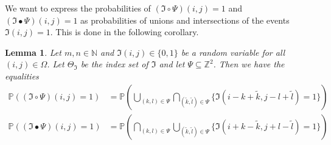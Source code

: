 \documentclass[a4paper,12pt]{article}
\theoremstyle{plain}
\newtheorem{lemma}[theorem]{Lemma}
\theoremstyle{definition}
\begin{document}
We want to express the probabilities of $(\mathfrak{I} \circ \Psi)(i, j) = 1$ and $(\mathfrak{I} \bullet \Psi)(i, j) = 1$ as probabilities of unions and intersections of the events $\mathfrak{I}(i, j) = 1$. This is done in the following corollary.

\begin{lemma}
	Let $m, n \in \mathbb{N}$ and $\mathfrak{I}(i, j) \in \{ 0, 1 \}$ be a random variable for all $(i, j) \in \Omega$. Let $\Theta_\mathfrak{I}$ be the index set of $\mathfrak{I}$ and let $\Psi \subseteq \mathbb{Z}^2$. Then we have the equalities
	\begin{align}
		\mathbb{P}\left( (\mathfrak{I} \circ \Psi)(i, j) = 1 \right) &= \mathbb{P}\left( \bigcup_{(k, l) \in \Psi} \bigcap_{(\tilde{k}, \tilde{l}) \in \Psi} \{ \mathfrak{I}(i - k + \tilde{k}, j - l + \tilde{l}) = 1 \} \label{eqeventopening} \right) \\
		\mathbb{P}\left( (\mathfrak{I} \bullet \Psi)(i, j) = 1 \right) &= \mathbb{P}\left( \bigcap_{(k, l) \in \Psi} \bigcup_{(\tilde{k}, \tilde{l}) \in \Psi} \{ \mathfrak{I}(i + k - \tilde{k}, j + l - \tilde{l}) = 1 \} \right) \label{eqeventclosing}
	\end{align}
\end{lemma}
\end{document}
